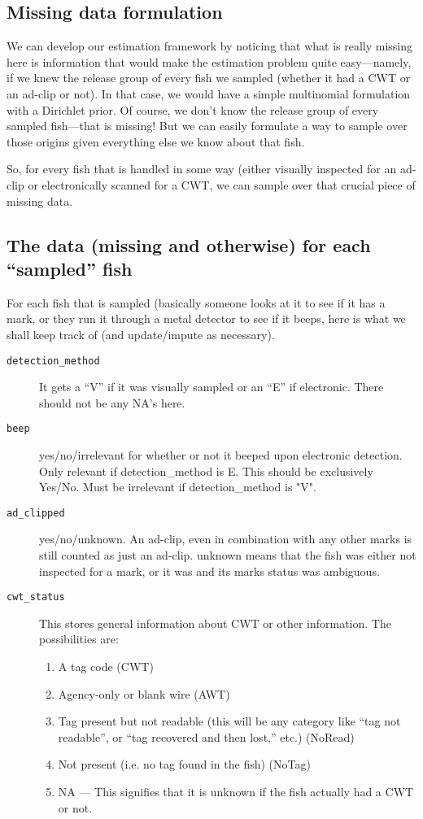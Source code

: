 \documentclass[11pt]{article}
\begin{document}
\subsection{Missing data formulation}
We can develop our estimation framework by noticing that what is really missing here is information
that would make the estimation problem quite easy---namely, if we knew the release group of every
fish we sampled (whether it had a CWT or an ad-clip or not).  In that case, we would have a simple multinomial
formulation with a Dirichlet prior.  Of course, we don't know the release group of every sampled
fish---that is missing!  But we can easily formulate a way to sample over those origins given
everything else we know about that fish.  

So, for every fish that is handled in some way (either visually inspected for an ad-clip or
electronically scanned for a CWT, we can sample over that crucial piece of missing data.  

\subsection{The data (missing and otherwise) for each ``sampled'' fish}

For each fish that is sampled (basically someone looks at it to see if it has a mark, or they
run it through a metal detector to see if it beeps, here is what we shall keep track of (and
update/impute as necessary).

\begin{description}
	\item [{\tt detection\_method}]  It gets a ``V'' if it was visually sampled or an ``E'' if electronic.  There should
	not be any NA's here.
	\item [{\tt beep}] yes/no/irrelevant for whether or not it beeped upon electronic detection. Only relevant if detection\_method is E.  This should be exclusively Yes/No. Must be irrelevant if
	detection\_method is "V".
	\item [{\tt ad\_clipped}]  yes/no/unknown.  An ad-clip, even in combination with any other marks is still counted
	as just an ad-clip.  unknown means that the fish was either not
	inspected for a mark, or it was and its marks status was ambiguous.
	\item [{\tt cwt\_status}] This stores general information about CWT or other information.  The possibilities are:
	\begin{enumerate}
		\item A tag code (CWT)
		\item Agency-only or blank wire (AWT)
		\item Tag present but not readable (this will be any category like ``tag not readable'', or ``tag
		recovered and then lost,'' etc.) (NoRead)
		\item Not present (i.e. no tag found in the fish)  (NoTag)
		\item NA --- This signifies that it is unknown if the fish actually had a CWT or not.
	\end{enumerate}

\end{description}
\end{document}
